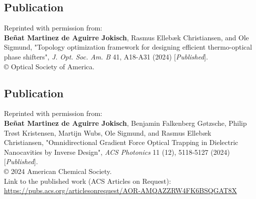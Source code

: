 \vspace*{0.4\textheight}
\begin{center}
  \begin{minipage}{0.9\linewidth}
    \section*{Publication \cite{ownpub0}}

    Reprinted with permission from:\\ 

    \textbf{Beñat Martinez de Aguirre Jokisch}, Rasmus Ellebæk Christiansen, and Ole Sigmund, "Topology optimization framework for designing efficient thermo-optical phase shifters", \textit{J. Opt. Soc. Am. B} 41, A18-A31 (2024) [\textit{Published}]. \\
  
    © Optical Society of America.

  \end{minipage}
\end{center}
\newpage


\vspace*{0.4\textheight}
\begin{center}
  \begin{minipage}{0.9\linewidth}
    \section*{Publication \cite{ownpub1}}

    Reprinted with permission from:\\ 

    \textbf{Beñat Martinez de Aguirre Jokisch}, Benjamin Falkenberg Gøtzsche, Philip Trøst Kristensen, Martijn Wubs, Ole Sigmund, and Rasmus Ellebæk Christiansen, "Omnidirectional Gradient Force Optical Trapping in Dielectric Nanocavities by Inverse Design", \textit{ACS Photonics} 11 (12), 5118-5127 (2024) [\textit{Published}]. \\

    © 2024 American Chemical Society.\\

    Link to the published work (ACS Articles on Request):\\
     \url{https://pubs.acs.org/articlesonrequest/AOR-AMQAZZRW4FK6BSQGAT8X}
  \end{minipage}
\end{center}
\newpage



